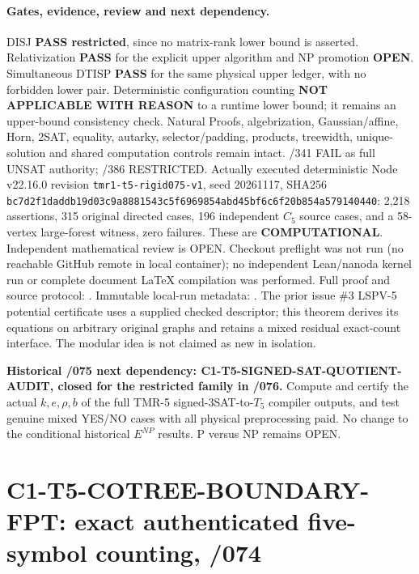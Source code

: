 \documentclass[11pt]{article}
\begin{document}
\paragraph{Gates, evidence, review and next dependency.}
DISJ \textbf{PASS restricted}, since no matrix-rank lower bound
is asserted. Relativization \textbf{PASS} for the explicit
upper algorithm and NP promotion \textbf{OPEN}. Simultaneous
DTISP \textbf{PASS} for the same physical upper ledger, with
no forbidden lower pair. Deterministic configuration counting
\textbf{NOT APPLICABLE WITH REASON} to a runtime lower bound;
it remains an upper-bound consistency check.
Natural Proofs, algebrization, Gaussian/affine, Horn, 2SAT,
equality, autarky, selector/padding, products, treewidth,
unique-solution and shared computation controls remain intact.
/341 FAIL as full UNSAT authority; /386 RESTRICTED.
Actually executed deterministic Node v22.16.0 revision
\texttt{tmr1-t5-rigid075-v1}, seed 20261117, SHA256
\texttt{bc7d2f1daddb19d03c9a8881543c5f6969854abd45bf6c6f20b854a579140440}:
2,218 assertions, 315 original directed cases, 196
independent $C_5$ source cases, and a 58-vertex large-forest
witness, zero failures. These are \textbf{COMPUTATIONAL}.
Independent mathematical review is OPEN. Checkout preflight
was not run (no reachable GitHub remote in local container);
no independent Lean/nanoda kernel run or complete document
LaTeX compilation was performed.
Full proof and source protocol:
.
Immutable local-run metadata:
.
The prior issue \#3 LSPV-5 potential certificate uses
a supplied checked descriptor; this theorem derives its
equations on arbitrary original graphs and retains a mixed
residual exact-count interface. The modular idea is not
claimed as new in isolation.

\textbf{Historical /075 next dependency: C1-T5-SIGNED-SAT-QUOTIENT-AUDIT, closed for the restricted family in /076.}
Compute and certify the actual $k,e,\rho,b$ of the full
TMR-5 signed-3SAT-to-$T_5$ compiler outputs, and test genuine
mixed YES/NO cases with all physical preprocessing paid.
No change to the conditional historical $E^{NP}$ results.
P versus NP remains OPEN.

\section{C1-T5-COTREE-BOUNDARY-FPT: exact authenticated five-symbol counting, /074}
\end{document}
